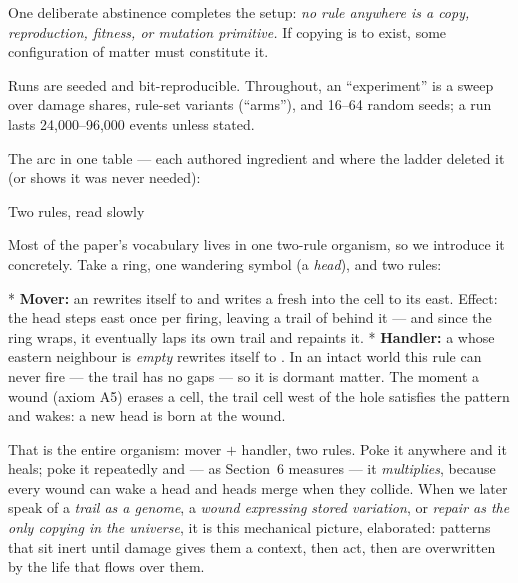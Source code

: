 One deliberate abstinence completes the setup: {\it no rule
anywhere is a copy, reproduction, fitness, or mutation primitive.}
If copying is to exist, some configuration of matter must
constitute it.

Runs are seeded and bit-reproducible. Throughout, an
“experiment” is a sweep over damage shares, rule-set variants
(“arms”), and 16--64 random seeds; a run lasts 24{,}000--96{,}000
events unless stated.

\medskip
\noindent The arc in one table --- each authored ingredient and
where the ladder deleted it (or shows it was never needed):

\medskip
\noindent{}
\medskip

\sec Two rules, read slowly

Most of the paper's vocabulary lives in one two-rule organism, so
we introduce it concretely. Take a ring, one wandering symbol 
(a {\it head}), and two rules:

\begitems
* {\bf Mover:} an  rewrites itself to  and writes a fresh
 into the cell to its east. Effect: the head steps east once
per firing, leaving a trail of  behind it --- and since the
ring wraps, it eventually laps its own trail and repaints it.
* {\bf Handler:} a  whose eastern neighbour is {\it empty}
rewrites itself to . In an intact world this rule can never
fire --- the trail has no gaps --- so it is dormant matter. The
moment a wound (axiom A5) erases a cell, the trail cell west of the
hole satisfies the pattern and wakes: a new head is born at the
wound.
\enditems

That is the entire organism: mover $+$ handler, two rules. Poke it
anywhere and it heals; poke it repeatedly and --- as Section~6
measures --- it {\it multiplies}, because every wound can wake a
head and heads merge when they collide. When we later speak of a
{\it trail as a genome}, a {\it wound expressing stored variation},
or {\it repair as the only copying in the universe}, it is this
mechanical picture, elaborated: patterns that sit inert until
damage gives them a context, then act, then are overwritten by the
life that flows over them.

